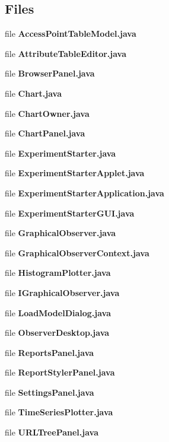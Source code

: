 \subsection*{Files}
\begin{DoxyCompactItemize}
\item 
file {\bfseries Access\-Point\-Table\-Model.\-java}
\item 
file {\bfseries Attribute\-Table\-Editor.\-java}
\item 
file {\bfseries Browser\-Panel.\-java}
\item 
file {\bfseries Chart.\-java}
\item 
file {\bfseries Chart\-Owner.\-java}
\item 
file {\bfseries Chart\-Panel.\-java}
\item 
file {\bfseries Experiment\-Starter.\-java}
\item 
file {\bfseries Experiment\-Starter\-Applet.\-java}
\item 
file {\bfseries Experiment\-Starter\-Application.\-java}
\item 
file {\bfseries Experiment\-Starter\-G\-U\-I.\-java}
\item 
file {\bfseries Graphical\-Observer.\-java}
\item 
file {\bfseries Graphical\-Observer\-Context.\-java}
\item 
file {\bfseries Histogram\-Plotter.\-java}
\item 
file {\bfseries I\-Graphical\-Observer.\-java}
\item 
file {\bfseries Load\-Model\-Dialog.\-java}
\item 
file {\bfseries Observer\-Desktop.\-java}
\item 
file {\bfseries Reports\-Panel.\-java}
\item 
file {\bfseries Report\-Styler\-Panel.\-java}
\item 
file {\bfseries Settings\-Panel.\-java}
\item 
file {\bfseries Time\-Series\-Plotter.\-java}
\item 
file {\bfseries U\-R\-L\-Tree\-Panel.\-java}
\end{DoxyCompactItemize}
